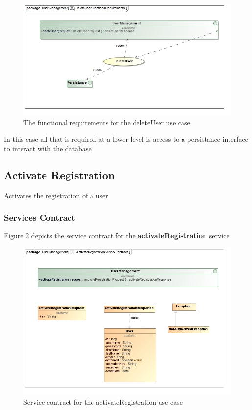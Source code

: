 \begin{figure}[H]
	\begin{center}
		\includegraphics[scale=0.5]{../Diagrams and Charts/Users/deleteUserFunctionalRequirements.jpg}
		\caption{The functional requirements for the deleteUser use case}
		\label{fig:deleteUserFR}
	\end{center}	
\end{figure}

In this case all that is required at a lower level is access to a persistance
interface to interact with the database.


\subsection{Activate Registration}
Activates the registration of a user

\subsubsection{Services Contract}
Figure \ref{fig:activateRegSC} depicts the service
contract for the \textbf{activateRegistration} service.

\begin{figure}[H]
	\begin{center}
		\includegraphics[scale=0.55]{../Diagrams and Charts/Users/ActivateRegistrationServiceContract.jpg}
		\caption{Service contract for the activateRegistration use case}
		\label{fig:activateRegSC}
	\end{center}
\end{figure}

